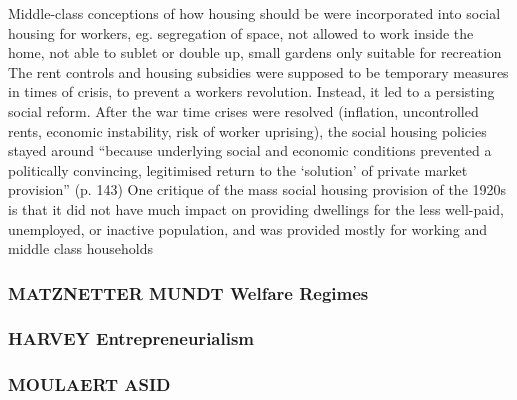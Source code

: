 \documentclass{article}
\begin{document}
\begin{outline}
			\3 Middle-class conceptions of how housing should be were incorporated into social housing for workers, eg. segregation of space, not allowed to work inside the home, not able to sublet or double up, small gardens only suitable for recreation
		\1 The rent controls and housing subsidies were supposed to be temporary measures in times of crisis, to prevent a workers revolution. Instead, it led to a persisting social reform. After the war time crises were resolved (inflation, uncontrolled rents, economic instability, risk of worker uprising), the social housing policies stayed around ``because underlying social and economic conditions prevented a politically convincing, legitimised return to the `solution' of private market provision'' (p. 143)
		\1 One critique of the mass social housing provision of the 1920s is that it did not have much impact on providing dwellings for the less well-paid, unemployed, or inactive population, and was provided mostly for working and middle class households
\end{outline}

\subsubsection{MATZNETTER MUNDT Welfare Regimes}


\subsubsection{HARVEY Entrepreneurialism}

\subsubsection{MOULAERT ASID}



\begin{comment}
\begin{chronology}[10]{1900}{2010}{100ex}[\textwidth]
\event{1930}{Bismarckian (pioneers)}
\event{1960}{Beveridgian (divergence)}
\event{1997}{Convergence}
\end{chronology}
\end{comment}

\printbibliography
\end{document}
